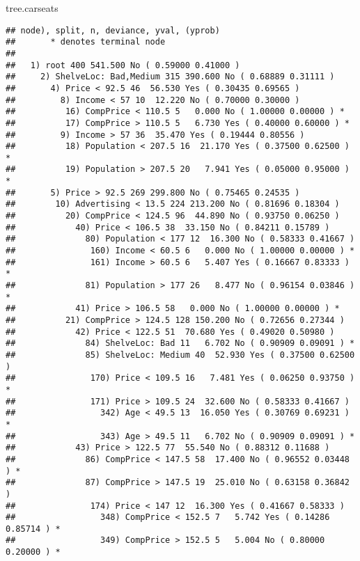 \documentclass[]{article}
\newenvironment{Shaded}{\begin{snugshade}}{\end{snugshade}}
\newcommand{\NormalTok}[1]{#1}
\begin{document}
\begin{Shaded}
\begin{Highlighting}[]
\NormalTok{tree.carseats}
\end{Highlighting}
\end{Shaded}

\begin{verbatim}
## node), split, n, deviance, yval, (yprob)
##       * denotes terminal node
## 
##   1) root 400 541.500 No ( 0.59000 0.41000 )  
##     2) ShelveLoc: Bad,Medium 315 390.600 No ( 0.68889 0.31111 )  
##       4) Price < 92.5 46  56.530 Yes ( 0.30435 0.69565 )  
##         8) Income < 57 10  12.220 No ( 0.70000 0.30000 )  
##          16) CompPrice < 110.5 5   0.000 No ( 1.00000 0.00000 ) *
##          17) CompPrice > 110.5 5   6.730 Yes ( 0.40000 0.60000 ) *
##         9) Income > 57 36  35.470 Yes ( 0.19444 0.80556 )  
##          18) Population < 207.5 16  21.170 Yes ( 0.37500 0.62500 ) *
##          19) Population > 207.5 20   7.941 Yes ( 0.05000 0.95000 ) *
##       5) Price > 92.5 269 299.800 No ( 0.75465 0.24535 )  
##        10) Advertising < 13.5 224 213.200 No ( 0.81696 0.18304 )  
##          20) CompPrice < 124.5 96  44.890 No ( 0.93750 0.06250 )  
##            40) Price < 106.5 38  33.150 No ( 0.84211 0.15789 )  
##              80) Population < 177 12  16.300 No ( 0.58333 0.41667 )  
##               160) Income < 60.5 6   0.000 No ( 1.00000 0.00000 ) *
##               161) Income > 60.5 6   5.407 Yes ( 0.16667 0.83333 ) *
##              81) Population > 177 26   8.477 No ( 0.96154 0.03846 ) *
##            41) Price > 106.5 58   0.000 No ( 1.00000 0.00000 ) *
##          21) CompPrice > 124.5 128 150.200 No ( 0.72656 0.27344 )  
##            42) Price < 122.5 51  70.680 Yes ( 0.49020 0.50980 )  
##              84) ShelveLoc: Bad 11   6.702 No ( 0.90909 0.09091 ) *
##              85) ShelveLoc: Medium 40  52.930 Yes ( 0.37500 0.62500 )  
##               170) Price < 109.5 16   7.481 Yes ( 0.06250 0.93750 ) *
##               171) Price > 109.5 24  32.600 No ( 0.58333 0.41667 )  
##                 342) Age < 49.5 13  16.050 Yes ( 0.30769 0.69231 ) *
##                 343) Age > 49.5 11   6.702 No ( 0.90909 0.09091 ) *
##            43) Price > 122.5 77  55.540 No ( 0.88312 0.11688 )  
##              86) CompPrice < 147.5 58  17.400 No ( 0.96552 0.03448 ) *
##              87) CompPrice > 147.5 19  25.010 No ( 0.63158 0.36842 )  
##               174) Price < 147 12  16.300 Yes ( 0.41667 0.58333 )  
##                 348) CompPrice < 152.5 7   5.742 Yes ( 0.14286 0.85714 ) *
##                 349) CompPrice > 152.5 5   5.004 No ( 0.80000 0.20000 ) *

\end{verbatim}
\end{document}
